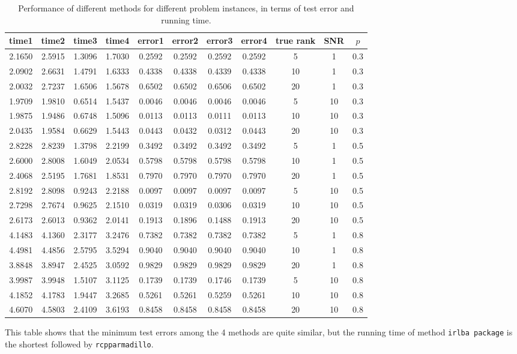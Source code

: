 \documentclass{article}
\begin{document}
\begin{table}[!htp]
\centering
\begin{tabular}{|c|c|c|c|c|c|c|c|c|c|c|}
\hline
time1&time2&time3&time4&error1&error2&error3&error4&true rank&SNR&$p$\\
\hline
2.1650&2.5915&1.3096&1.7030&0.2592&0.2592&0.2592&0.2592&5&1&0.3\\
\hline
2.0902&2.6631&1.4791&1.6333&0.4338&0.4338&0.4339&0.4338&10&1&0.3\\
\hline
2.0032&2.7237&1.6506&1.5678&0.6502&0.6502&0.6506&0.6502&20&1&0.3\\
\hline
1.9709&1.9810&0.6514&1.5437&0.0046&0.0046&0.0046&0.0046&5&10&0.3\\
\hline
1.9875&1.9486&0.6748&1.5096&0.0113&0.0113&0.0111&0.0113&10&10&0.3\\
\hline
2.0435&1.9584&0.6629&1.5443&0.0443&0.0432&0.0312&0.0443&20&10&0.3\\
\hline
2.8228&2.8239&1.3798&2.2199&0.3492&0.3492&0.3492&0.3492&5&1&0.5\\
\hline
2.6000&2.8008&1.6049&2.0534&0.5798&0.5798&0.5798&0.5798&10&1&0.5\\
\hline
2.4068&2.5195&1.7681&1.8531&0.7970&0.7970&0.7970&0.7970&20&1&0.5\\
\hline
2.8192&2.8098&0.9243&2.2188&0.0097&0.0097&0.0097&0.0097&5&10&0.5\\
\hline
2.7298&2.7674&0.9625&2.1510&0.0319&0.0319&0.0306&0.0319&10&10&0.5\\
\hline
2.6173&2.6013&0.9362&2.0141&0.1913&0.1896&0.1488&0.1913&20&10&0.5\\
\hline
4.1483&4.1360&2.3177&3.2476&0.7382&0.7382&0.7382&0.7382&5&1&0.8\\
\hline
4.4981&4.4856&2.5795&3.5294&0.9040&0.9040&0.9040&0.9040&10&1&0.8\\
\hline
3.8848&3.8947&2.4525&3.0592&0.9829&0.9829&0.9829&0.9829&20&1&0.8\\
\hline
3.9987&3.9948&1.5107&3.1125&0.1739&0.1739&0.1746&0.1739&5&10&0.8\\
\hline
4.1852&4.1783&1.9447&3.2685&0.5261&0.5261&0.5259&0.5261&10&10&0.8\\
\hline
4.6070&4.5803&2.4109&3.6193&0.8458&0.8458&0.8458&0.8458&20&10&0.8\\
\hline
\end{tabular}
\caption{Performance of different methods for different problem instances, in terms of test error and running time.}
\end{table}

This table shows that the minimum test errors among the 4 methods are quite similar, but the running time of method \verb|irlba package| is the shortest followed by \verb|rcpparmadillo|.
\end{document}
